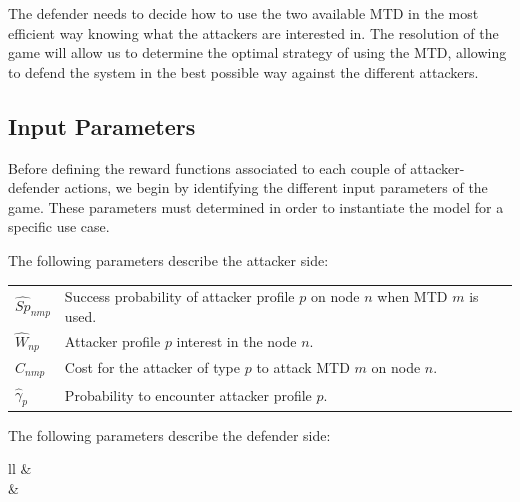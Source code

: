 The defender needs to decide how to use the two available MTD in the most efficient way knowing what the attackers are interested in. The resolution of the game will allow us to determine the optimal strategy of using the MTD, allowing to defend the system in the best possible way against the different attackers.

\subsection{Input Parameters}

Before defining the reward functions associated to each couple of attacker-defender actions, we begin by identifying the different input parameters of the game.
These parameters must determined in order to instantiate the model for a specific use case. 

The following parameters describe the attacker side:\\

\begin{table}[h]
\begin{tabular}{ll}
\multicolumn{1}{l}{$\widehat{Sp}_{nmp}$} & \multicolumn{1}{l}{Success probability of attacker profile $p$ on node $n$ when MTD $m$ is used.}     \\ 
\multicolumn{1}{l}{$\widehat{W}_{np}$}   & \multicolumn{1}{l}{Attacker profile $p$ interest in the node $n$.}                                             \\
\multicolumn{1}{l}{$\widehat{C}_{nmp}$}  & \multicolumn{1}{l}{Cost for the attacker of type $p$ to attack MTD $m$ on node $n$.} \\ 
\multicolumn{1}{l}{$\widehat{\gamma}_p$} & \multicolumn{1}{l}{Probability to encounter attacker profile $p$.}                                          \\ 
\end{tabular}
\end{table}

The following parameters describe the defender side:\\

\begin{table}[h]
\begin{tabular}{ll}
             &                          \\ 
       &                                            \\ 
 \end{tabular}
\end{table}


